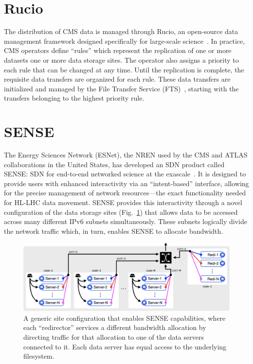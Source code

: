 \section{Rucio}
The distribution of CMS data is managed through Rucio, an open-source data management framework designed specifically for large-scale science~\cite{Rucio2019}. 
In practice, CMS operators define ``rules'' which represent the replication of one or more datasets one or more data storage sites. 
The operator also assigns a priority to each rule that can be changed at any time. 
Until the replication is complete, the requisite data transfers are organized for each rule. 
These data transfers are initialized and managed by the File Transfer Service (FTS)~\cite{FTS3}, starting with the transfers belonging to the highest priority rule. 

\section{SENSE}
The Energy Sciences Network (ESNet), the NREN used by the CMS and ATLAS collaborations in the United States, has developed an SDN product called SENSE: SDN for end-to-end networked science at the exascale~\cite{SENSE}. 
It is designed to provide users with enhanced interactivity via an ``intent-based'' interface, allowing for the precise management of network resources---the exact functionality needed for HL-LHC data movement. 
SENSE provides this interactivity through a novel configuration of the data storage sites (Fig.~\ref{fig:sense_site}) that allows data to be accessed across many different IPv6 subnets simultaneously. 
These subnets logically divide the network traffic which, in turn, enables SENSE to allocate bandwidth. 

\begin{figure}[htb]
    \centering
    \includegraphics[width=.9\textwidth]{fig/cyber/rucio-sense_site.png}
    \caption[Rucio-SENSE site configuration]{
        A generic site configuration that enables SENSE capabilities, where each ``redirector'' services a different bandwidth allocation by directing traffic for that allocation to one of the data servers connected to it. 
        Each data server has equal access to the underlying filesystem.
    }
    \label{fig:sense_site}
\end{figure}

